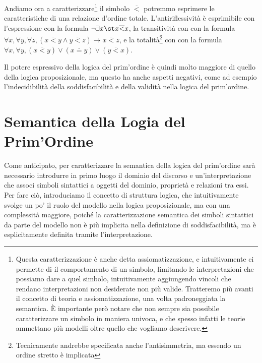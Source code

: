 Andiamo ora a caratterizzare\footnote{
  Questa caratterizzazione è anche detta assiomatizzazione, e intuitivamente ci permette di  il comportamento di un simbolo, limitando le interpretazioni che possiamo dare a quel simbolo, intuitivamente aggiungendo vincoli che rendano interpretazioni non desiderate non più valide. Tratteremo più avanti il concetto di teoria e assiomatizzazione, una volta padroneggiata la semantica. È importante però notare che non sempre sia possibile caratterizzare un simbolo in maniera univoca, e che spesso infatti le teorie ammettano più modelli oltre quello che vogliamo descrivere.
} il simbolo \(\overline{<}\) potremmo esprimere le caratteristiche di una relazione d'ordine totale. L'antiriflessività è esprimibile con l'espressione  con la formula \(\neg \exists x\st x \overline{<} x\), la transitività con  con la formula \(\forall x, \forall y, \forall z, (x \overline{<} y \land y \overline{<} z)\to x \overline{<} z\), e la totalità\footnote{Tecnicamente andrebbe specificata anche l'antisimmetria, ma essendo un ordine stretto è implicata} con  con la formula \(\forall x, \forall y, (x \overline{<} y)\lor(x\overline{=}y)\lor(y\overline{<} x)\).

Il potere espressivo della logica del prim'ordine è quindi molto maggiore di quello della logica proposizionale, ma questo ha anche aspetti negativi, come ad esempio l'indecidibilità della soddisfacibilità e della validità nella logica del prim'ordine.

\section{Semantica della Logia del Prim'Ordine}

Come anticipato, per caratterizzare la semantica della logica del prim'ordine sarà necessario introdurre in primo luogo il dominio del discorso e un'interpretazione che associ simboli sintattici a oggetti del dominio, proprietà e relazioni tra essi. Per fare ciò, introduciamo il concetto di struttura logica, che intuitivamente svolge un po' il ruolo del modello nella logica proposizionale, ma con una complessità maggiore, poiché la caratterizzazione semantica dei simboli sintattici da parte del modello non è più implicita nella definizione di soddisfacibilità, ma è esplicitamente definita tramite l'interpretazione. 

